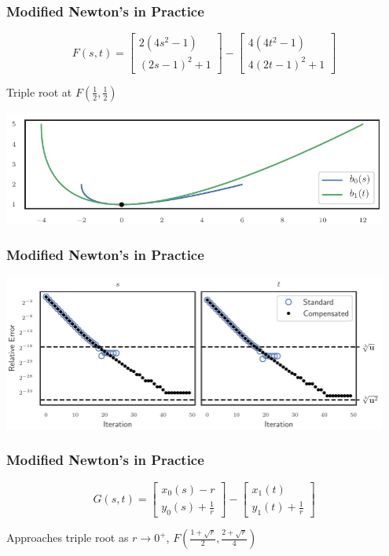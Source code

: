 \documentclass{beamer}
\begin{document}
\begin{frame}
\frametitle{Modified Newton's in Practice}
\begin{equation*}
F(s, t) = \left[ \begin{array}{c} 2(4s^2 - 1) \\ (2s - 1)^2 + 1
\end{array}\right] - \left[ \begin{array}{c} 4(4t^2 - 1) \\ 4(2t - 1)^2 + 1
\end{array}\right]
\end{equation*}
\pause
\begin{center}
Triple root at \(F\left(\frac{1}{2}, \frac{1}{2}\right)\)
\end{center}
\pause
\begin{center}
\includegraphics[width=0.95\textwidth]
                {../images/slides/tangent_intersection.pdf}
\end{center}
\end{frame}

\begin{frame}
\frametitle{Modified Newton's in Practice}
\begin{center}
\includegraphics[width=0.95\textwidth]
                {../images/compensated-newton/newton_linear_converge.pdf}
\end{center}
\end{frame}

\begin{frame}
\frametitle{Modified Newton's in Practice}
\begin{equation*}
G(s, t) = \left[ \begin{array}{c} x_0(s) - r \\ y_0(s) + \frac{1}{r}
\end{array}\right] - \left[ \begin{array}{c} x_1(t) \\ y_1(t) + \frac{1}{r}
\end{array}\right]
\end{equation*}
\pause
\begin{center}
Approaches triple root as \(r \longrightarrow 0^+\),
  \(F\left(\frac{1 + \sqrt{r}}{2}, \frac{2 + \sqrt{r}}{4}\right)\)
\end{center}
\end{frame}
\end{document}

